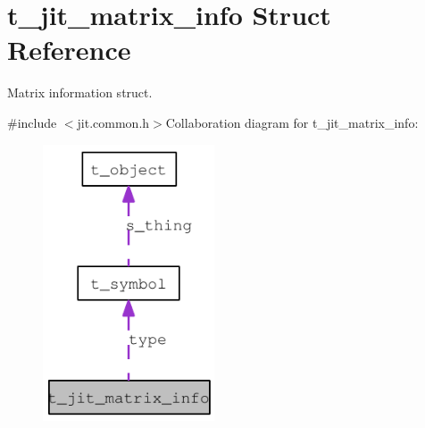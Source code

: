 \hypertarget{structt__jit__matrix__info}{
\section{t\_\-jit\_\-matrix\_\-info Struct Reference}
\label{structt__jit__matrix__info}
}


Matrix information struct.  


{\ttfamily \#include $<$jit.common.h$>$}Collaboration diagram for t\_\-jit\_\-matrix\_\-info:\nopagebreak
\begin{figure}[H]
\begin{center}
\leavevmode
\includegraphics[width=144pt]{structt__jit__matrix__info__coll__graph}
\end{center}
\end{figure}
